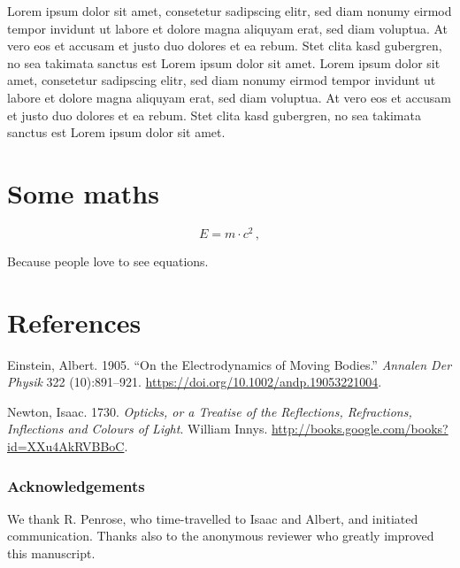 \documentclass[a4paper,]{article}
\begin{document}
Lorem ipsum dolor sit amet, consetetur sadipscing elitr, sed diam nonumy eirmod tempor invidunt ut labore et dolore magna aliquyam erat, sed diam voluptua. At vero eos et accusam et justo duo dolores et ea rebum. Stet clita kasd gubergren, no sea takimata sanctus est Lorem ipsum dolor sit amet. Lorem ipsum dolor sit amet, consetetur sadipscing elitr, sed diam nonumy eirmod tempor invidunt ut labore et dolore magna aliquyam erat, sed diam voluptua. At vero eos et accusam et justo duo dolores et ea rebum. Stet clita kasd gubergren, no sea takimata sanctus est Lorem ipsum dolor sit amet.
\appendix

\hypertarget{some-maths}{%
\section{Some maths}\label{some-maths}}

\begin{equation} E = m\cdot c^2\,, \label{eq:emc2}\end{equation}

Because people love to see equations.

\hypertarget{references}{%
\section*{References}\label{references}}

\hypertarget{refs}{}
\leavevmode\hypertarget{ref-Einstein1905}{}%
Einstein, Albert. 1905. ``On the Electrodynamics of Moving Bodies.'' \emph{Annalen Der Physik} 322 (10):891--921. \url{https://doi.org/10.1002/andp.19053221004}.

\leavevmode\hypertarget{ref-Newton1730}{}%
Newton, Isaac. 1730. \emph{Opticks, or a Treatise of the Reflections, Refractions, Inflections and Colours of Light}. William Innys. \url{http://books.google.com/books?id=XXu4AkRVBBoC}.

\subsubsection*{Acknowledgements}
{\small We thank R. Penrose, who time-travelled to Isaac and Albert, and initiated communication.
Thanks also to the anonymous reviewer who greatly improved this manuscript.}
\end{document}
